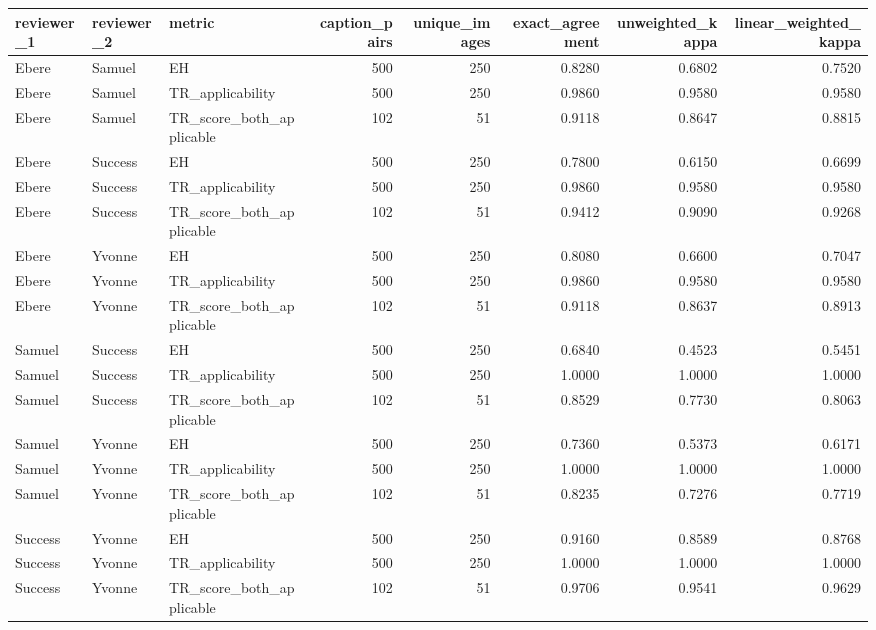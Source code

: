 \begin{tabular}{lllrrrrr}
\toprule
reviewer\_1 & reviewer\_2 & metric & caption\_pairs & unique\_images & exact\_agreement & unweighted\_kappa & linear\_weighted\_kappa \\
\midrule
Ebere & Samuel & EH & 500 & 250 & 0.8280 & 0.6802 & 0.7520 \\
Ebere & Samuel & TR\_applicability & 500 & 250 & 0.9860 & 0.9580 & 0.9580 \\
Ebere & Samuel & TR\_score\_both\_applicable & 102 & 51 & 0.9118 & 0.8647 & 0.8815 \\
Ebere & Success & EH & 500 & 250 & 0.7800 & 0.6150 & 0.6699 \\
Ebere & Success & TR\_applicability & 500 & 250 & 0.9860 & 0.9580 & 0.9580 \\
Ebere & Success & TR\_score\_both\_applicable & 102 & 51 & 0.9412 & 0.9090 & 0.9268 \\
Ebere & Yvonne & EH & 500 & 250 & 0.8080 & 0.6600 & 0.7047 \\
Ebere & Yvonne & TR\_applicability & 500 & 250 & 0.9860 & 0.9580 & 0.9580 \\
Ebere & Yvonne & TR\_score\_both\_applicable & 102 & 51 & 0.9118 & 0.8637 & 0.8913 \\
Samuel & Success & EH & 500 & 250 & 0.6840 & 0.4523 & 0.5451 \\
Samuel & Success & TR\_applicability & 500 & 250 & 1.0000 & 1.0000 & 1.0000 \\
Samuel & Success & TR\_score\_both\_applicable & 102 & 51 & 0.8529 & 0.7730 & 0.8063 \\
Samuel & Yvonne & EH & 500 & 250 & 0.7360 & 0.5373 & 0.6171 \\
Samuel & Yvonne & TR\_applicability & 500 & 250 & 1.0000 & 1.0000 & 1.0000 \\
Samuel & Yvonne & TR\_score\_both\_applicable & 102 & 51 & 0.8235 & 0.7276 & 0.7719 \\
Success & Yvonne & EH & 500 & 250 & 0.9160 & 0.8589 & 0.8768 \\
Success & Yvonne & TR\_applicability & 500 & 250 & 1.0000 & 1.0000 & 1.0000 \\
Success & Yvonne & TR\_score\_both\_applicable & 102 & 51 & 0.9706 & 0.9541 & 0.9629 \\
\bottomrule
\end{tabular}
